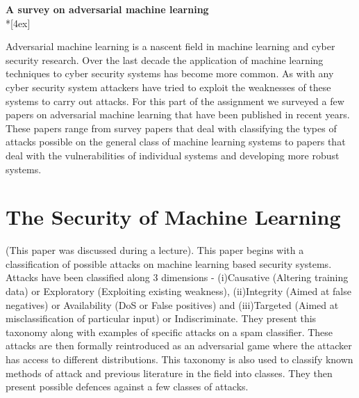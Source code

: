 \documentclass[11pt]{article}
\begin{document}
\thispagestyle{empty}
\parindent 0pt
\vfill
\large

\begin{center}
\LARGE{\bf \textsf{A survey on adversarial machine learning}} \\*[4ex]
\end{center}
Adversarial machine learning is a nascent field in machine learning and cyber security research. Over the last decade the application of machine learning techniques to cyber security systems has become more common. As with any cyber security system attackers have tried to exploit the weaknesses of these systems to carry out attacks. For this part of the assignment we surveyed a few papers on adversarial machine learning that have been published in recent years. These papers range from survey papers that deal with classifying the types of attacks possible on the general class of machine learning systems to papers that deal with the vulnerabilities of individual systems and developing more robust systems. \\
\section{The Security of Machine Learning} (This paper was discussed during a lecture). This paper begins with a classification of possible attacks on machine learning based security systems. Attacks have been classified along 3 dimensions - (i)Causative (Altering training data) or Exploratory (Exploiting existing weakness), (ii)Integrity (Aimed at false negatives) or Availability (DoS or False positives) and (iii)Targeted (Aimed at misclassification of particular input) or Indiscriminate. They present this taxonomy along with examples of specific attacks on a spam classifier. These attacks are then formally reintroduced as an adversarial game where the attacker has access to different distributions. This taxonomy is also used to classify known methods of attack and previous literature in the field into classes. They then present possible defences against a few classes of attacks.\\ \\
\end{document}
